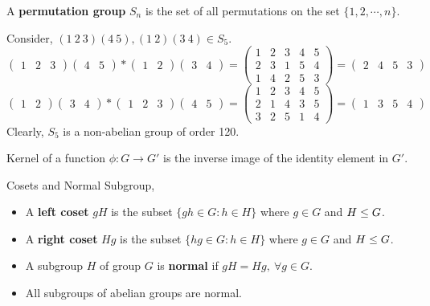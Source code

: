 \begin{definition}
	A \textbf{permutation group} $S_n$ is the set of all permutations on the set $\{1,2,\cdots,n\}$.	
\end{definition}

\begin{remark}
	Consider, $(1\ 2\ 3)(4\ 5), (1\ 2)(3\ 4) \in S_5$.
	$$\begin{pmatrix} 1 & 2 & 3 \end{pmatrix} \begin{pmatrix} 4 & 5 \end{pmatrix} \ast \begin{pmatrix} 1 & 2 \end{pmatrix} \begin{pmatrix} 3 & 4 \end{pmatrix} =  \begin{pmatrix} 1 & 2 & 3 & 4 & 5 \\ 2 & 3 & 1 & 5 & 4 \\ 1 & 4 & 2 & 5 & 3 \end{pmatrix}  = \begin{pmatrix} 2 & 4 & 5 & 3 \end{pmatrix} $$
	$$\begin{pmatrix} 1 & 2 \end{pmatrix} \begin{pmatrix} 3 & 4 \end{pmatrix} \ast \begin{pmatrix} 1 & 2 & 3\end{pmatrix} \begin{pmatrix} 4 & 5 \end{pmatrix} =  \begin{pmatrix} 1 & 2 & 3 & 4 & 5 \\ 2 & 1 & 4 & 3 & 5 \\ 3 & 2 & 5 & 1 & 4 \end{pmatrix}  = \begin{pmatrix} 1 & 3 & 5 & 4 \end{pmatrix} $$
	Clearly, $S_5$ is a non-abelian group of order 120.
\end{remark}

\begin{definition}
	Kernel of a function $\phi : G \to G'$ is the inverse image of the identity element in $G'$.%
\end{definition}

\begin{definition}Cosets and Normal Subgroup,
	\begin{itemize}
		\item A \textbf{left coset} $gH$ is the subset $\{ gh \in G : h \in H \}$ where $g \in G$ and  $H \le G$.%
		\item A \textbf{right coset} $Hg$ is the subset $\{ hg \in G : h \in H \}$ where $g \in G$ and  $H \le G$.%
		\item A subgroup $H$ of group $G$ is \textbf{normal} if $gH = Hg,\ \forall g \in G$.
		\item All subgroups of abelian groups are normal.
	\end{itemize}
\end{definition}

